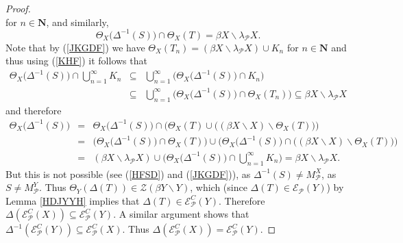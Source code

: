 \documentclass{amsart}
\theoremstyle{definition}
\theoremstyle{remark}
\theoremstyle{notation}
\numberwithin{equation}{section}
\begin{document}
\begin{proof}
\begin{equation}
\end{equation}
for $n\in \mathbf{N}$, and similarly,
\[\Theta_X\big(\Delta^{-1}(S)\big)\cap\Theta_X(T)=\beta X\backslash\lambda_{{\mathcal P}} X.\]
Note that by (\ref{JKGDF}) we have $\Theta_X(T_n)=(\beta X\backslash\lambda_{{\mathcal P}} X)\cup K_n$ for $n\in \mathbf{N}$ and thus using (\ref{KHF}) it follows that
\begin{eqnarray*}
\Theta_X\big(\Delta^{-1}(S)\big)\cap\bigcup_{n=1}^\infty K_n&\subseteq&\bigcup_{n=1}^\infty\big(\Theta_X\big(\Delta^{-1}(S)\big)\cap K_n\big)\\&\subseteq&\bigcup_{n=1}^\infty\big(\Theta_X\big(\Delta^{-1}(S)\big)\cap \Theta_X(T_n)\big)\subseteq\beta X\backslash\lambda_{{\mathcal P}} X
\end{eqnarray*}
and therefore
\begin{eqnarray*}
\Theta_X\big(\Delta^{-1}(S)\big)&=&\Theta_X\big(\Delta^{-1}(S)\big)\cap\big(\Theta_X(T)\cup\big((\beta X\backslash X)\backslash\Theta_X(T)\big)\big)\\&=&\big(\Theta_X\big(\Delta^{-1}(S)\big)\cap\Theta_X(T)\big)\cup\big(\Theta_X\big(\Delta^{-1}(S)\big)\cap\big((\beta X\backslash X)\backslash\Theta_X(T)\big)\big)
\\&=&(\beta X\backslash\lambda_{{\mathcal P}} X)\cup\Big(\Theta_X\big(\Delta^{-1}(S)\big)\cap\bigcup_{n=1}^\infty K_n\Big)=\beta X\backslash\lambda_{{\mathcal P}} X.
\end{eqnarray*}
But this is not possible (see (\ref{HFSD}) and (\ref{JKGDF})), as $\Delta^{-1}(S)\neq M^X_{{\mathcal P}}$,
as $S\neq M^Y_{{\mathcal P}}$. Thus $\Theta_Y(\Delta(T))\in {\mathscr Z}(\beta Y\backslash Y)$, which (since
$\Delta(T)\in{\mathscr E}_{{\mathcal P}}(Y)$)
by Lemma \ref{HDJYYH} implies that $\Delta(T)\in{\mathscr E}^C_{{\mathcal P}}(Y)$. Therefore
$\Delta({\mathscr E}^C_{{\mathcal P}}(X))\subseteq{\mathscr E}^C_{{\mathcal P}}(Y)$. A similar argument shows that
$\Delta^{-1}({\mathscr E}^C_{{\mathcal P}}(Y))\subseteq{\mathscr E}^C_{{\mathcal P}}(X)$. Thus $\Delta({\mathscr E}^C_{{\mathcal P}}(X))={\mathscr E}^C_{{\mathcal P}}(Y)$.


\end{proof}
\end{document}

